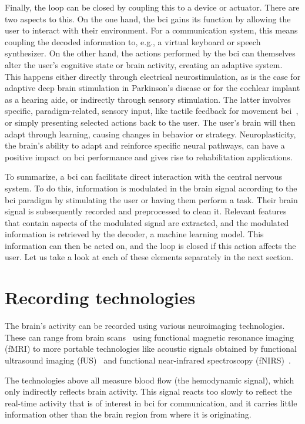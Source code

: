 Finally, the loop can be closed by coupling this to a device or actuator.
There are two aspects to this.
On the one hand, the \ac{bci} gains its function by allowing the user to interact with
their environment.
For a communication system, this means coupling the decoded information to, e.g., a
virtual keyboard or speech synthesizer.
On the other hand, the actions performed by the \ac{bci} can themselves alter the user's
cognitive state or brain activity, creating an adaptive system.
This happens either directly through electrical neurostimulation, as is the
case for adaptive deep brain stimulation in Parkinson's disease or for the
cochlear implant as a hearing aide, or indirectly through sensory stimulation.
The latter involves specific, paradigm-related, sensory input, like tactile feedback for
movement \ac{bci}~\cite{Flesher2021}, or simply presenting selected actions back to the
user.
The user's brain will then adapt through learning, causing changes in
behavior or strategy.
Neuroplasticity, the brain's ability to adapt and reinforce specific neural pathways,
can have a positive impact on \ac{bci} performance and gives rise to rehabilitation
applications.

To summarize, a \ac{bci} can facilitate direct interaction with the central nervous
system.
To do this, information is modulated in the brain signal according to the \ac{bci}
paradigm by stimulating the user or having them perform a task.
Their brain signal is subsequently recorded and preprocessed to clean it.
Relevant features that contain aspects of the modulated signal are extracted, and the
modulated information is retrieved by the decoder, a machine learning model.
This information can then be acted on, and the loop is closed if this action affects the
user.
Let us take a look at each of these elements separately in the next section.

\section{Recording technologies}
\label{sec:bci-recording}

The brain's activity can be recorded using various neuroimaging technologies.
These can range from brain scans~\cite{Weiskopf2004} using functional magnetic resonance
imaging (fMRI) to more portable technologies like acoustic signals obtained by
functional ultrasound imaging (fUS)~\cite{Zheng2023} and functional near-infrared spectroscopy
(fNIRS)~\cite{Borgheai2020}.

The technologies above all measure blood flow (the hemodynamic signal), which only
indirectly reflects brain activity.
This signal reacts too slowly to reflect the real-time activity that is of interest in
\ac{bci} for communication, and it carries little information other than the brain
region from where it is originating.

